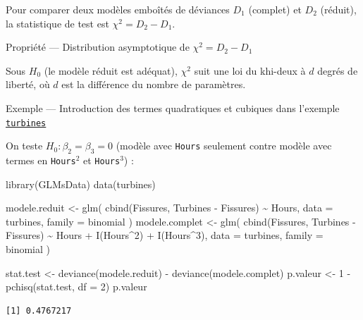 \documentclass[
  french,
  letterpaper,
  DIV=11,
  numbers=noendperiod]{scrreprt}
\newenvironment{Shaded}{\begin{snugshade}}{\end{snugshade}}
\newcommand{\AttributeTok}[1]{\textcolor[rgb]{0.40,0.45,0.13}{#1}}
\newcommand{\DecValTok}[1]{\textcolor[rgb]{0.68,0.00,0.00}{#1}}
\newcommand{\FunctionTok}[1]{\textcolor[rgb]{0.28,0.35,0.67}{#1}}
\newcommand{\NormalTok}[1]{\textcolor[rgb]{0.00,0.23,0.31}{#1}}
\newcommand{\OtherTok}[1]{\textcolor[rgb]{0.00,0.23,0.31}{#1}}
\newcommand{\SpecialCharTok}[1]{\textcolor[rgb]{0.37,0.37,0.37}{#1}}
\begin{document}
Pour comparer deux modèles emboîtés de déviances \(D_1\) (complet) et
\(D_2\) (réduit), la statistique de test est \(\chi^2 = D_2 - D_1\).

{Propriété --- Distribution asymptotique de \(\chi^2 = D_2-D_1\)}

Sous \(H_0\) (le modèle réduit est adéquat), \(\chi^2\) suit une loi du
khi-deux à \(d\) degrés de liberté, où \(d\) est la différence du nombre
de paramètres.

{Exemple --- Introduction des termes quadratiques et cubiques dans
l'exemple \hyperref[data-turbines]{\texttt{turbines}}}

On teste \(H_0: \beta_2 = \beta_3 = 0\) (modèle avec \texttt{Hours}
seulement contre modèle avec termes en \texttt{Hours}\(^2\) et
\texttt{Hours}\(^3\)) :

\begin{Shaded}
\begin{Highlighting}[]
\FunctionTok{library}\NormalTok{(GLMsData)}
\FunctionTok{data}\NormalTok{(turbines)}

\NormalTok{modele.reduit }\OtherTok{\textless{}{-}} \FunctionTok{glm}\NormalTok{(}
  \FunctionTok{cbind}\NormalTok{(Fissures, Turbines }\SpecialCharTok{{-}}\NormalTok{ Fissures) }\SpecialCharTok{\textasciitilde{}}\NormalTok{ Hours,}
  \AttributeTok{data =}\NormalTok{ turbines,}
  \AttributeTok{family =}\NormalTok{ binomial}
\NormalTok{)}
\NormalTok{modele.complet }\OtherTok{\textless{}{-}} \FunctionTok{glm}\NormalTok{(}
  \FunctionTok{cbind}\NormalTok{(Fissures, Turbines }\SpecialCharTok{{-}}\NormalTok{ Fissures) }\SpecialCharTok{\textasciitilde{}}\NormalTok{ Hours }\SpecialCharTok{+} \FunctionTok{I}\NormalTok{(Hours}\SpecialCharTok{\^{}}\DecValTok{2}\NormalTok{) }\SpecialCharTok{+} \FunctionTok{I}\NormalTok{(Hours}\SpecialCharTok{\^{}}\DecValTok{3}\NormalTok{),}
  \AttributeTok{data =}\NormalTok{ turbines,}
  \AttributeTok{family =}\NormalTok{ binomial}
\NormalTok{)}

\NormalTok{stat.test }\OtherTok{\textless{}{-}} \FunctionTok{deviance}\NormalTok{(modele.reduit) }\SpecialCharTok{{-}} \FunctionTok{deviance}\NormalTok{(modele.complet)}
\NormalTok{p.valeur }\OtherTok{\textless{}{-}} \DecValTok{1} \SpecialCharTok{{-}} \FunctionTok{pchisq}\NormalTok{(stat.test, }\AttributeTok{df =} \DecValTok{2}\NormalTok{)}
\NormalTok{p.valeur}
\end{Highlighting}
\end{Shaded}

\begin{verbatim}
[1] 0.4767217
\end{verbatim}
\end{document}
